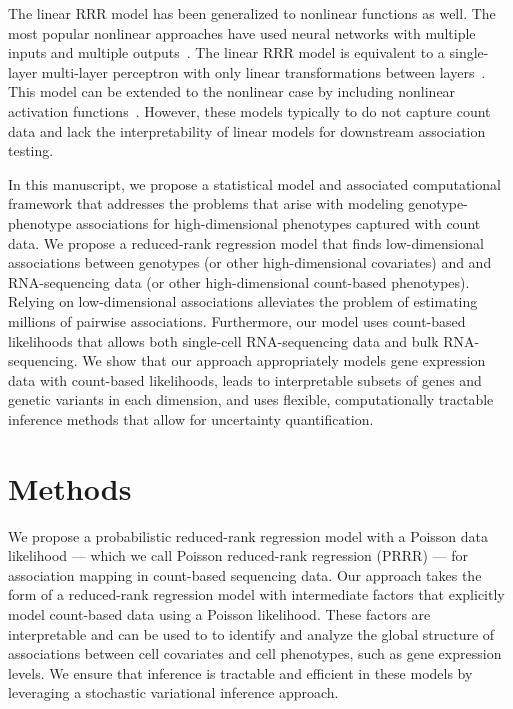 \documentclass{bmcart}
\begin{document}
The linear RRR model has been generalized to nonlinear functions as well. The most popular nonlinear approaches have used neural networks with multiple inputs and multiple outputs~\citep{diamantaras1994multilayer}. The linear RRR model is equivalent to a single-layer multi-layer perceptron with only linear transformations between layers~\citep{baldi1989neural,kunin2019loss}. This model can be extended to the nonlinear case by including nonlinear activation functions~\citep{baldi1989neural,aoyagi2005stochastic}. However, these models typically to do not capture count data and lack the interpretability of linear models for downstream association testing.

In this manuscript, we propose a statistical model and associated computational framework that addresses the problems that arise with modeling genotype-phenotype associations for high-dimensional phenotypes captured with count data. We propose a reduced-rank regression model that finds low-dimensional associations between genotypes (or other high-dimensional covariates) and and RNA-sequencing data (or other high-dimensional count-based phenotypes). Relying on low-dimensional associations alleviates the problem of estimating millions of pairwise associations. Furthermore, our model uses count-based likelihoods that allows both single-cell RNA-sequencing data and bulk RNA-sequencing. We show that our approach appropriately models gene expression data with count-based likelihoods, leads to interpretable subsets of genes and genetic variants in each dimension, and uses flexible, computationally tractable inference methods that allow for uncertainty quantification.

\section*{Methods}
We propose a probabilistic reduced-rank regression model with a Poisson data likelihood --- which we call Poisson reduced-rank regression (PRRR) --- for association mapping in count-based sequencing data. Our approach takes the form of a reduced-rank regression model with intermediate factors that explicitly model count-based data using a Poisson likelihood. These factors are interpretable and can be used to to identify and analyze the global structure of associations between cell covariates and cell phenotypes, such as gene expression levels. We ensure that inference is tractable and efficient in these models by leveraging a stochastic variational inference approach.
\end{document}
